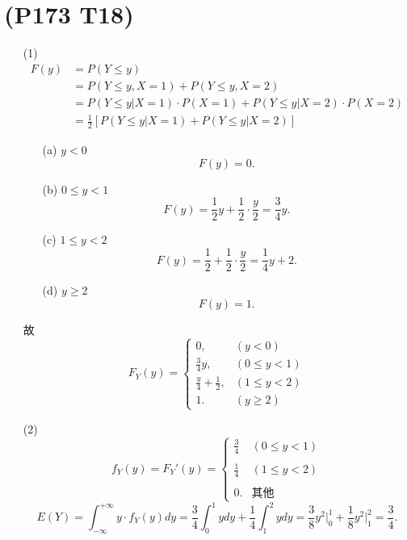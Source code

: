 \documentclass{article}
\begin{document}
\section{(P173 T18)}  %
\begin{enumerate}
    \item [(1)]
    \[
        \begin{aligned}
        F(y)
        & = P(Y\leq y)\\
        & = P(Y\leq y, X=1) + P(Y\leq y, X=2)\\
        & = P(Y\leq y| X=1) \cdot P(X=1) + P(Y\leq y | X=2) \cdot P(X=2)\\
        & = \frac{1}{2} \left[ P(Y\leq y| X=1) + P(Y\leq y| X=2) \right]
        \end{aligned}
    \]
    \begin{enumerate}
        \item [(a)]$y<0$
        \[
            F(y) = 0.    
        \]
        \item [(b)]$0\leq y <1$
        \[
            F(y) = \frac{1}{2}y + \frac{1}{2}\cdot \frac{y}{2} = \frac{3}{4} y.    
        \]
        \item [(c)]$1\leq y <2$
        \[
            F(y) = \frac{1}{2} + \frac{1}{2}\cdot \frac{y}{2} = \frac{1}{4}y + 2.    
        \]
        \item [(d)]$y\geq 2$
        \[
            F(y) = 1.
        \]
    \end{enumerate}
    故
    \[
        F_{Y} (y)    
        = 
        \begin{cases}
            0,  & (y<0) \\
            \frac{3}{4}y, & (0\leq y <1) \\
            \frac{y}{4} + \frac{1}{2}, & (1\leq y <2) \\
            1. &(y\geq 2) 
        \end{cases}
    \]
    \item [(2)]
    \[
        f_{Y} (y)
        = F_{Y} '(y)
        = 
        \begin{cases}
            \displaystyle{\frac{3}{4}} & (0\leq y <1)\\
            \\
            \displaystyle{\frac{1}{4}} & (1\leq y <2)\\
            \\
            0. & \mbox{其他}
        \end{cases}
    \]
    \[
        E(Y)
        = \int_{-\infty}^{+\infty} y \cdot f_{Y} (y) dy
        = \frac{3}{4} \int_{0}^{1} y dy + \frac{1}{4} \int_{1}^{2} y dy
        = \frac{3}{8} y^2 \big|_{0}^{1} + \frac{1}{8} y^2 \big|_{1}^{2}
        = \frac{3}{4}.
    \]
\end{enumerate}
\end{document}
